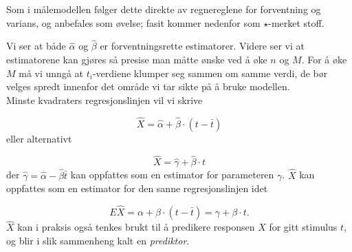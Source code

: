 \begin{center}  \end{center}
Som i målemodellen følger dette direkte av regnereglene for forventning
og varians, og anbefales som øvelse; fasit kommer nedenfor som
$\star$-merket stoff.

Vi ser at både $\hat\alpha$ og $\hat\beta$ er forventningsrette
estimatorer. Videre ser vi at estimatorene kan gjøres så presise man
måtte ønske ved å øke $n$ og $M$. For å øke $M$
må vi unngå at $t_i$-verdiene klumper seg sammen om
samme verdi, de bør velges spredt innenfor det område vi
tar sikte på å bruke modellen.\\

Minste kvadraters regresjonslinjen vil vi skrive

\[ \hat{X}=\hat{\alpha} + \hat{\beta}\cdot (t - \bar t)\]
eller alternativt

\[ \hat{X}=\hat{\gamma} +\hat{\beta}\cdot t\]
der $\hat\gamma=\hat\alpha - \hat\beta\bar t$ kan oppfattes som
en estimator for parameteren $\gamma$. $\hat{X}$ kan oppfattes som
en estimator for den sanne regresjonslinjen idet

\[  E\hat{X}=\alpha + \beta \cdot (t-\bar t)=\gamma +\beta \cdot t .\]
$\hat X$ kan i praksis også tenkes brukt til å predikere
responsen $X$ for gitt sti\-mulus $t$, og blir i slik sammenheng
kalt en {\em prediktor}.\\


